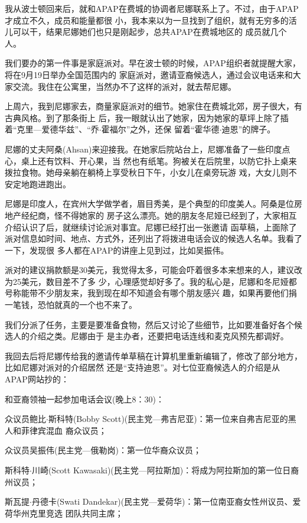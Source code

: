 ﻿\documentclass[11pt]{article}
\begin{document}
我从波士顿回来后，就和APAP在费城的协调者尼娜联系上了。不过，由于APAP才成立不久，成员和能量都很
小，我本来以为一旦找到了组织，就有无穷多的活儿可以干，结果尼娜她们也只是刚起步，总共APAP在费城地区的
成员就几个人。

我们要办的第一件事是家庭派对。早在波士顿的时候，APAP组织者就提醒大家，将在9月19日举办全国范围内的
家庭派对，邀请亚裔候选人，通过会议电话来和大家交流。我住在公寓里，当然办不了这样的派对，就去帮尼娜。

上周六，我到尼娜家去，商量家庭派对的细节。她家住在费城北郊，房子很大，有古典风格。到了那条街上
后，我一眼就认出了她家，因为她家的草坪上除了插着``克里---爱德华兹''、``乔$\cdot$霍福尔''之外，还保
留着``霍华德$\cdot$迪恩''的牌子。

尼娜的丈夫阿桑(Ahsan)来迎接我。在她家后院站台上，尼娜准备了一些印度点心，桌上还有饮料、开心果，当
然也有纸笔。狗被关在后院里，以防它扑上桌来拨拉食物。她母亲躺在躺椅上享受秋日下午，小女儿在桌旁玩游
戏，大女儿则不安定地跑进跑出。

尼娜是印度人，在宾州大学做学者，眉目秀美，是个典型的印度美人。阿桑是位房地产经纪商，怪不得她家的
房子这么漂亮。她的朋友冬尼娅已经到了，大家相互介绍认识了后，就继续讨论派对事宜。尼娜已经打出一张邀请
函草稿，上面除了派对信息如时间、地点、方式外，还列出了将拨进电话会议的候选人名单。我看了一下，发现很
多人都在APAP的讲座上见到过，比如吴振伟。

派对的建议捐款额是30美元，我觉得太多，可能会吓着很多本来想来的人，建议改为25美元，数目差不了多
少，心理感觉却好多了。我的私心是，尼娜和冬尼娅都号称能带不少朋友来，我到现在却不知道会有哪个朋友感兴
趣，如果再要他们捐一笔钱，恐怕就真的一个也不来了。

我们分派了任务，主要是要准备食物，然后又讨论了些细节，比如要准备好各个候选人的介绍之类。尼娜由于
是主办者，还要把电话连线和麦克风预先都调好。

我回去后将尼娜传给我的邀请传单草稿在计算机里重新编辑了，修改了部分地方，比如尼娜对派对的介绍居然
还是``支持迪恩''。对七位亚裔候选人的介绍是从APAP网站抄的：

和亚裔领袖一起参加电话会议(晚上8：30)：

众议员鲍比$\cdot$斯科特(Bobby Scott)(民主党---弗吉尼亚)：第一位来自弗吉尼亚的黑人和菲律宾混血
裔众议员；

众议员吴振伟(民主党---俄勒岗)：第一位华裔众议员；

斯科特$\cdot$川崎(Scott Kawasaki)(民主党---阿拉斯加)：将成为阿拉斯加的第一位日裔州议员；

斯瓦提$\cdot$丹德卡(Swati Dandekar)(民主党---爱荷华)：第一位南亚裔女性州议员、爱荷华州克里竞选
团队共同主席；
\end{document}
